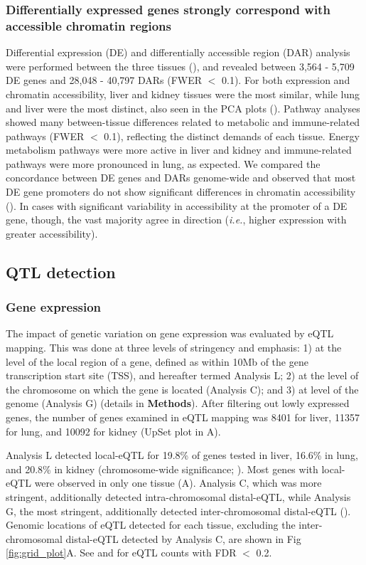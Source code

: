 \documentclass[10pt,letterpaper]{article}
\newcommand{\ie}{\emph{i.e.}\xspace}
\begin{document}
\subsubsection*{Differentially expressed genes strongly correspond with accessible chromatin regions} 
Differential expression (DE) and differentially accessible region (DAR) analysis were performed between the three tissues (), and revealed between 3,564 - 5,709 DE genes and 28,048 - 40,797 DARs (FWER $<$ 0.1). For both expression and chromatin accessibility, liver and kidney tissues were the most similar, while lung and liver were the most distinct, also seen in the PCA plots (). Pathway analyses showed many between-tissue differences related to metabolic and immune-related pathways (FWER $<$ 0.1), reflecting the distinct demands of each tissue. Energy metabolism pathways were more active in liver and kidney and immune-related pathways were more pronounced in lung, as expected. We compared the concordance between DE genes and DARs genome-wide and observed that most DE gene promoters do not show significant differences in chromatin accessibility (). In cases with significant variability in accessibility at the promoter of a DE gene, though, the vast majority agree in direction (\ie, higher expression with greater accessibility).

\subsection*{QTL detection}

\subsubsection*{Gene expression}
The impact of genetic variation on gene expression was evaluated by eQTL mapping. This was done at three levels of stringency and emphasis: 1) at the level of the local region of a gene, defined as within 10Mb of the gene transcription start site (TSS), and hereafter termed Analysis L; 2) at the level of the chromosome on which the gene is located (Analysis C); and 3) at level of the genome (Analysis G) (details in \textbf{Methods}).
After filtering out lowly expressed genes, the number of genes examined in eQTL mapping was 8401 for liver, 11357 for lung, and 10092 for kidney (UpSet plot \cite{Conway2017} in A).

Analysis L detected local-eQTL for 19.8\% of genes tested in liver, 16.6\% in lung, and 20.8\% in kidney (chromosome-wide significance; ).
Most genes with local-eQTL were observed in only one tissue (A).
Analysis C, which was more stringent, additionally detected intra-chromosomal distal-eQTL, while Analysis G, the most stringent, additionally detected inter-chromosomal distal-eQTL ().
Genomic locations of eQTL detected for each tissue, excluding the inter-chromosomal distal-eQTL detected by Analysis C, are shown in Fig \ref{fig:grid_plot}A. See  and  for eQTL counts with FDR $<$ 0.2.
\end{document}
